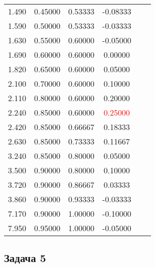 \documentclass[a4paper,12pt]{article}
\begin{document}
\begin{enumerate}
\begin{tabular}{|c|c|c|c|c|c|}
                  1.490 & 0.45000  & 0.53333  & -0.08333                 \\
                  1.590 & 0.50000  & 0.53333  & -0.03333                 \\
                  1.630 & 0.55000  & 0.60000  & -0.05000                 \\
                  1.690 & 0.60000  & 0.60000  & 0.00000                  \\
                  1.820 & 0.65000  & 0.60000  & 0.05000                  \\
                  2.100 & 0.70000  & 0.60000  & 0.10000                  \\
                  2.110 & 0.80000  & 0.60000  & 0.20000                  \\
                  2.240 & 0.85000  & 0.60000  & \textcolor{red}{0.25000} \\
                  2.420 & 0.85000  & 0.66667  & 0.18333                  \\
                  2.630 & 0.85000  & 0.73333  & 0.11667                  \\
                  3.240 & 0.85000  & 0.80000  & 0.05000                  \\
                  3.500 & 0.90000  & 0.80000  & 0.10000                  \\
                  3.720 & 0.90000  & 0.86667  & 0.03333                  \\
                  3.860 & 0.90000  & 0.93333  & -0.03333                 \\
                  7.170 & 0.90000  & 1.00000  & -0.10000                 \\
                  7.950 & 0.95000  & 1.00000  & -0.05000                 \\
                  \hline
              \end{tabular}
    \end{enumerate}
\fi

\subsection*{Задача 5 \cite[206, 207, 210]{Efimov}}
\end{document}
